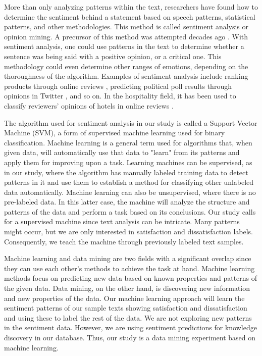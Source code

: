 \documentclass[smallextended,natbib]{svjour3}       %
\begin{document}
    More than only analyzing patterns within the text, researchers have found how to determine the sentiment behind a statement based on speech patterns, statistical patterns, and other methodologies. This method is called sentiment analysis or opinion mining. A precursor of this method was attempted decades ago \cite[][]{stone1966general}. With sentiment analysis, one could use patterns in the text to determine whether a sentence was being said with a positive opinion, or a critical one. This methodology could even determine other ranges of emotions, depending on the thoroughness of the algorithm. Examples of sentiment analysis include ranking products through online reviews \cite[e.g][]{liu2017149, zhang2011}, predicting political poll results through opinions in Twitter \cite[][]{oconnor2010}, and so on. In the hospitality field, it has been used to classify reviewers' opinions of hotels in online reviews \cite[e.g.][]{kim2017362, alsmadi2018}. 

    The algorithm used for sentiment analysis in our study is called a Support Vector Machine (SVM), a form of supervised machine learning used for binary classification. Machine learning is a general term used for algorithms that, when given data, will automatically use that data to "learn" from its patterns and apply them for improving upon a task. Learning machines can be supervised, as in our study, where the algorithm has manually labeled training data to detect patterns in it and use them to  establish a method for classifying other unlabeled data automatically. Machine learning can also be unsupervised, where there is no pre-labeled data. In this latter case, the machine will analyze the structure and patterns of the data and perform a task based on its conclusions. Our study calls for a supervised machine since text analysis can be intricate. Many patterns might occur, but we are only interested in satisfaction and dissatisfaction labels. Consequently, we teach the machine through previously labeled text samples. 

    Machine learning and data mining are two fields with a significant overlap since they can use each other's methods to achieve the task at hand. Machine learning methods focus on predicting new data based on known properties and patterns of the given data. Data mining, on the other hand, is discovering new information and new properties of the data. Our machine learning approach will learn the sentiment patterns of our sample texts showing satisfaction and dissatisfaction and using these to label the rest of the data. We are not exploring new patterns in the sentiment data. However, we are using sentiment predictions for knowledge discovery in our database. Thus, our study is a data mining experiment based on machine learning.
\end{document}
